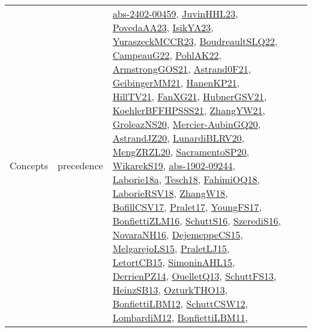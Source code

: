 {\begin{longtable}{llp{6cm}p{6cm}p{6cm}}
Concepts & precedence & \href{articles/abs-2402-00459.pdf}{abs-2402-00459}\cite{abs-2402-00459}, \href{papers/JuvinHHL23.pdf}{JuvinHHL23}\cite{JuvinHHL23}, \href{papers/PovedaAA23.pdf}{PovedaAA23}\cite{PovedaAA23}, \href{articles/IsikYA23.pdf}{IsikYA23}\cite{IsikYA23}, \href{articles/YuraszeckMCCR23.pdf}{YuraszeckMCCR23}\cite{YuraszeckMCCR23}, \href{papers/BoudreaultSLQ22.pdf}{BoudreaultSLQ22}\cite{BoudreaultSLQ22}, \href{articles/CampeauG22.pdf}{CampeauG22}\cite{CampeauG22}, \href{articles/PohlAK22.pdf}{PohlAK22}\cite{PohlAK22}, \href{papers/ArmstrongGOS21.pdf}{ArmstrongGOS21}\cite{ArmstrongGOS21}, \href{papers/Astrand0F21.pdf}{Astrand0F21}\cite{Astrand0F21}, \href{papers/GeibingerMM21.pdf}{GeibingerMM21}\cite{GeibingerMM21}, \href{papers/HanenKP21.pdf}{HanenKP21}\cite{HanenKP21}, \href{papers/HillTV21.pdf}{HillTV21}\cite{HillTV21}, \href{articles/FanXG21.pdf}{FanXG21}\cite{FanXG21}, \href{articles/HubnerGSV21.pdf}{HubnerGSV21}\cite{HubnerGSV21}, \href{articles/KoehlerBFFHPSSS21.pdf}{KoehlerBFFHPSSS21}\cite{KoehlerBFFHPSSS21}, \href{articles/ZhangYW21.pdf}{ZhangYW21}\cite{ZhangYW21}, \href{papers/GroleazNS20.pdf}{GroleazNS20}\cite{GroleazNS20}, \href{papers/Mercier-AubinGQ20.pdf}{Mercier-AubinGQ20}\cite{Mercier-AubinGQ20}, \href{articles/AstrandJZ20.pdf}{AstrandJZ20}\cite{AstrandJZ20}, \href{articles/LunardiBLRV20.pdf}{LunardiBLRV20}\cite{LunardiBLRV20}, \href{articles/MengZRZL20.pdf}{MengZRZL20}\cite{MengZRZL20}, \href{articles/SacramentoSP20.pdf}{SacramentoSP20}\cite{SacramentoSP20}, \href{articles/WikarekS19.pdf}{WikarekS19}\cite{WikarekS19}, \href{articles/abs-1902-09244.pdf}{abs-1902-09244}\cite{abs-1902-09244}, \href{papers/Laborie18a.pdf}{Laborie18a}\cite{Laborie18a}, \href{papers/Tesch18.pdf}{Tesch18}\cite{Tesch18}, \href{articles/FahimiOQ18.pdf}{FahimiOQ18}\cite{FahimiOQ18}, \href{articles/LaborieRSV18.pdf}{LaborieRSV18}\cite{LaborieRSV18}, \href{articles/ZhangW18.pdf}{ZhangW18}\cite{ZhangW18}, \href{papers/BofillCSV17.pdf}{BofillCSV17}\cite{BofillCSV17}, \href{papers/Pralet17.pdf}{Pralet17}\cite{Pralet17}, \href{papers/YoungFS17.pdf}{YoungFS17}\cite{YoungFS17}, \href{papers/BonfiettiZLM16.pdf}{BonfiettiZLM16}\cite{BonfiettiZLM16}, \href{papers/SchuttS16.pdf}{SchuttS16}\cite{SchuttS16}, \href{papers/SzerediS16.pdf}{SzerediS16}\cite{SzerediS16}, \href{articles/NovaraNH16.pdf}{NovaraNH16}\cite{NovaraNH16}, \href{papers/DejemeppeCS15.pdf}{DejemeppeCS15}\cite{DejemeppeCS15}, \href{papers/MelgarejoLS15.pdf}{MelgarejoLS15}\cite{MelgarejoLS15}, \href{papers/PraletLJ15.pdf}{PraletLJ15}\cite{PraletLJ15}, \href{articles/LetortCB15.pdf}{LetortCB15}\cite{LetortCB15}, \href{articles/SimoninAHL15.pdf}{SimoninAHL15}\cite{SimoninAHL15}, \href{papers/DerrienPZ14.pdf}{DerrienPZ14}\cite{DerrienPZ14}, \href{papers/OuelletQ13.pdf}{OuelletQ13}\cite{OuelletQ13}, \href{papers/SchuttFS13.pdf}{SchuttFS13}\cite{SchuttFS13}, \href{articles/HeinzSB13.pdf}{HeinzSB13}\cite{HeinzSB13}, \href{articles/OzturkTHO13.pdf}{OzturkTHO13}\cite{OzturkTHO13}, \href{papers/BonfiettiLBM12.pdf}{BonfiettiLBM12}\cite{BonfiettiLBM12}, \href{papers/SchuttCSW12.pdf}{SchuttCSW12}\cite{SchuttCSW12}, \href{articles/LombardiM12.pdf}{LombardiM12}\cite{LombardiM12}, \href{papers/BonfiettiLBM11.pdf}{BonfiettiLBM11}\cite{BonfiettiLBM11}, 
\end{longtable}}
